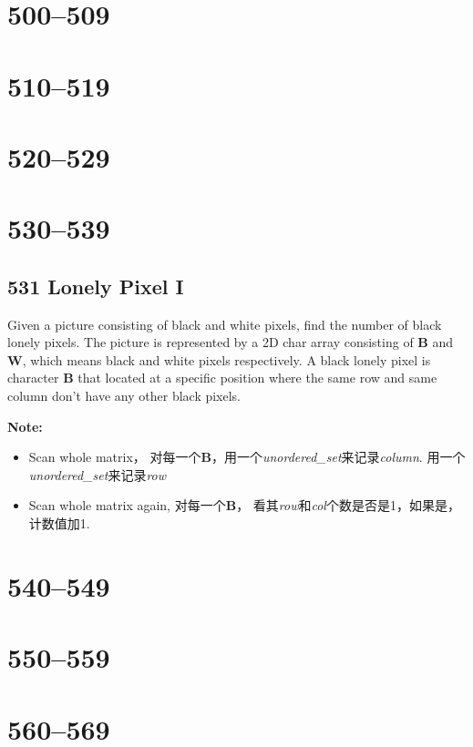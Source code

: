 \documentclass[a4paper,12pt]{article}
\begin{document}
	\section{500--509}
	\section{510--519}
	\section{520--529}
	\section{530--539}
	\subsection{531	Lonely Pixel I}
	Given a picture consisting of black and white pixels, find the number of black lonely pixels. The picture is represented by a 2D char array consisting of \textbf{B} and \textbf{W}, which means black and white pixels respectively. A black lonely pixel is character \textbf{B} that located at a specific position where the same row and same column don't have any other black pixels.
	\par
	\vspace{0.5em}
	\noindent
	\textbf{\large{Note:}}
	\begin{CJK*}{UTF8}{gbsn}
		\begin{itemize}
			\item Scan whole matrix， 对每一个\textbf{B}，用一个\textit{unordered\_set}来记录\textit{column}. 用一个\textit{unordered\_set}来记录\textit{row}
			\item Scan whole matrix again, 对每一个\textbf{B}， 看其\textit{row}和\textit{col}个数是否是1，如果是，计数值加1.
		\end{itemize}
		\clearpage\end{CJK*}
	
	\section{540--549}
	\section{550--559}
	\section{560--569}
	
\end{document}
